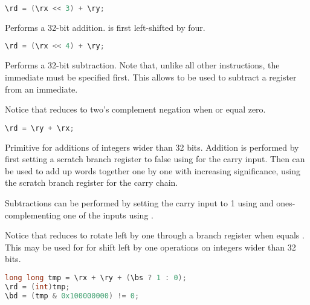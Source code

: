 \begin{lstlisting}[numbers=none, basicstyle=\ttfamily\footnotesize, language=C++]
\rd = (\rx << 3) + \ry;
\end{lstlisting}

Performs a 32-bit addition. \code{\rx} is first left-shifted by four.

\begin{lstlisting}[numbers=none, basicstyle=\ttfamily\footnotesize, language=C++]
\rd = (\rx << 4) + \ry;
\end{lstlisting}

Performs a 32-bit subtraction. Note that, unlike all other instructions, the
immediate must be specified first. This allows  to be used to subtract
a register from an immediate.

Notice that  reduces to two's complement negation when  or
 equal zero.

\begin{lstlisting}[numbers=none, basicstyle=\ttfamily\footnotesize, language=C++]
\rd = \ry + \rx;
\end{lstlisting}

Primitive for additions of integers wider than 32 bits. Addition is performed by 
first setting a scratch branch register to false using  for the 
carry input. Then  can be used to add up words together one by one 
with increasing significance, using the scratch branch register for the carry 
chain.

Subtractions can be performed by setting the carry input to 1 using  
and ones-complementing one of the inputs using .

Notice that  reduces to rotate left by one through a branch register
when  equals . This may be used for for shift left by one
operations on integers wider than 32 bits.

\begin{lstlisting}[numbers=none, basicstyle=\ttfamily\footnotesize, language=C++]
long long tmp = \rx + \ry + (\bs ? 1 : 0);
\rd = (int)tmp;
\bd = (tmp & 0x100000000) != 0;
\end{lstlisting}

